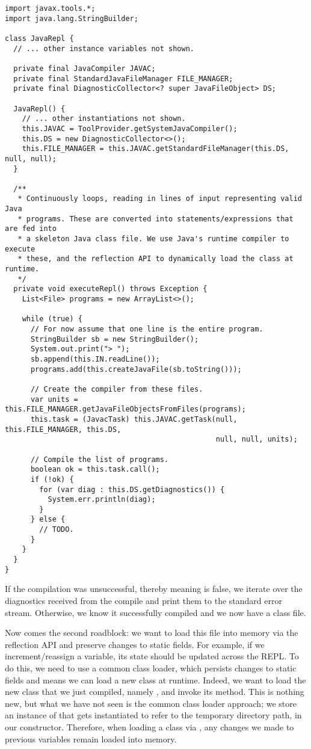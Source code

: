 \begin{lstlisting}[language=MyJava]
import javax.tools.*;
import java.lang.StringBuilder;

class JavaRepl {
  // ... other instance variables not shown.

  private final JavaCompiler JAVAC;
  private final StandardJavaFileManager FILE_MANAGER;
  private final DiagnosticCollector<? super JavaFileObject> DS;

  JavaRepl() {
    // ... other instantiations not shown.
    this.JAVAC = ToolProvider.getSystemJavaCompiler();
    this.DS = new DiagnosticCollector<>();
    this.FILE_MANAGER = this.JAVAC.getStandardFileManager(this.DS, null, null);
  }

  /**
   * Continuously loops, reading in lines of input representing valid Java
   * programs. These are converted into statements/expressions that are fed into
   * a skeleton Java class file. We use Java's runtime compiler to execute
   * these, and the reflection API to dynamically load the class at runtime.
   */
  private void executeRepl() throws Exception {
    List<File> programs = new ArrayList<>();

    while (true) {
      // For now assume that one line is the entire program.
      StringBuilder sb = new StringBuilder();
      System.out.print("> ");
      sb.append(this.IN.readLine());
      programs.add(this.createJavaFile(sb.toString()));

      // Create the compiler from these files.
      var units = this.FILE_MANAGER.getJavaFileObjectsFromFiles(programs);
      this.task = (JavacTask) this.JAVAC.getTask(null, this.FILE_MANAGER, this.DS,
                                                 null, null, units);

      // Compile the list of programs.
      boolean ok = this.task.call();
      if (!ok) {
        for (var diag : this.DS.getDiagnostics()) {
          System.err.println(diag);
        }
      } else {
        // TODO.
      }
    }
  }
}
\end{lstlisting}

If the compilation was unsuccessful, thereby meaning  is false, we iterate over the diagnostics received from the compile and print them to the standard error stream. Otherwise, we know it successfully compiled and we now have a class file.

Now comes the second roadblock: we want to load this file into memory via the reflection API and preserve changes to static fields. For example, if we increment/reassign a variable, its state should be updated across the REPL. To do this, we need to use a common class loader, which persists changes to static fields and means we can load a new class at runtime. Indeed, we want to load the new class that we just compiled, namely , and invoke its  method. This is nothing new, but what we have not seen is the common class loader approach; we store an instance of  that gets instantiated to refer to the temporary directory path, in our constructor. Therefore, when loading a class via , any changes we made to previous variables remain loaded into memory.

